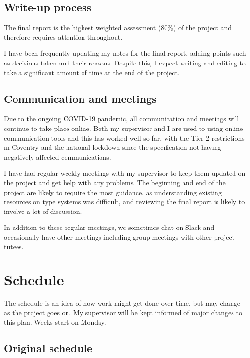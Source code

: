 \documentclass[a4paper,fleqn,12pt]{article}
\begin{document}
\subsection{Write-up process}\label{id:h.bhx39g801ds4}

The final report is the highest weighted assessment (80\%) of the project and therefore requires attention throughout.

I have been frequently updating my notes for the final report, adding points such as decisions taken and their reasons. Despite this, I expect writing and editing to take a significant amount of time at the end of the project.

\subsection{Communication and meetings}\label{id:h.k8ippxnoat7q}

Due to the ongoing COVID-19 pandemic, all communication and meetings will continue to take place online. Both my supervisor and I are used to using online communication tools and this has worked well so far, with the Tier 2 restrictions in Coventry and the national lockdown since the specification not having negatively affected communications.

I have had regular weekly meetings with my supervisor to keep them updated on the project and get help with any problems. The beginning and end of the project are likely to require the most guidance, as understanding existing resources on type systems was difficult, and reviewing the final report is likely to involve a lot of discussion.

In addition to these regular meetings, we sometimes chat on Slack and occasionally have other meetings including group meetings with other project tutees.

\section{Schedule}\label{id:h.7o2zxvygqpnu}

The schedule is an idea of how work might get done over time, but may change as the project goes on. My supervisor will be kept informed of major changes to this plan. Weeks start on Monday.

\subsection{Original schedule}\label{id:h.7j9eipb829lw}
\end{document}
